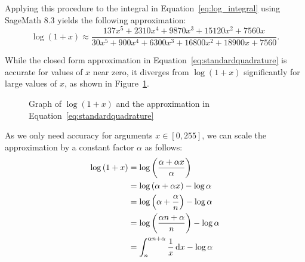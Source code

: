 Applying this procedure to the integral in Equation~\ref{eq:log_integral} using SageMath 8.3 yields the following approximation:
\begin{equation}\label{eq:standardquadrature}
  \log(1+x) \approx
  \frac{137x^5 + 2310x^4 + 9870x^3 + 15120x^2 + 7560x}
  {30x^5 + 900x^4 + 6300x^3 + 16800x^2 + 18900x + 7560}.
\end{equation}


While the closed form approximation in Equation~\ref{eq:standardquadrature} is accurate for values of $x$ near zero, it diverges from $\log{(1+x)}$ significantly for large values of $x$, as shown in Figure~\ref{fig:standardquadrature}.
\begin{figure}[!ht]
    \centering
    \caption{Graph of $\log{(1+x)}$ and the approximation in Equation~\ref{eq:standardquadrature}}
    \label{fig:standardquadrature}
\end{figure}

As we only need accuracy for arguments $x \in [0, 255]$, we can scale the approximation by a constant factor $\alpha$ as follows:
\begin{align*}
  \log{(1+x)} &= \log{\left(\frac{\alpha + \alpha x}{\alpha}\right)}\\
  &= \log{(\alpha + \alpha x)} - \log{\alpha}\\
  &= \log{\left(\alpha+\frac{\alpha}{n}\right)} - \log{\alpha}\\
  &= \log{\left(\frac{\alpha n + \alpha}{n}\right)} - \log{\alpha}\\
  &= \int_{n}^{\alpha n + \alpha}{\frac{1}{x}\mathop{}\!\mathrm{d} x} - \log{\alpha}
\end{align*}

